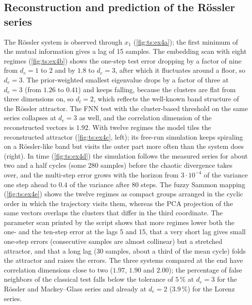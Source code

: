 \subsection{Reconstruction and prediction of the R\"ossler series}

The R\"ossler system is observed through $x_1$ (\cref{fig:ts:ex4a}); the first minimum of the mutual information gives a lag of 15 samples. The embedding scan with eight regimes (\cref{fig:ts:ex4b}) shows the one-step test error dropping by a factor of nine from $d_e=1$ to $2$ and by $1.8$ to $d_e=3$, after which it fluctuates around a floor, so $d_e=3$. The prior-weighted smallest eigenvalue drops by a factor of three at $d_e=3$ (from $1.26$ to $0.41$) and keeps falling, because the clusters are flat from three dimensions on, so $d_l=2$, which reflects the well-known band structure of the R\"ossler attractor. The FNN test with the cluster-based threshold on the same series collapses at $d_e=3$ as well, and the correlation dimension of the reconstructed vectors is $1.92$. With twelve regimes the model tiles the reconstructed attractor (\cref{fig:ts:ex4c}, left); its free-run simulation keeps spiraling on a R\"ossler-like band but visits the outer part more often than the system does (right). In time (\cref{fig:ts:ex4d}) the simulation follows the measured series for about two and a half cycles (some 280 samples) before the chaotic divergence takes over, and the multi-step error grows with the horizon from $3\cdot10^{-4}$ of the variance one step ahead to $0.4$ of the variance after 80 steps. The fuzzy Sammon mapping (\cref{fig:ts:ex4e}) shows the twelve regimes as compact groups arranged in the cyclic order in which the trajectory visits them, whereas the PCA projection of the same vectors overlaps the clusters that differ in the third coordinate. The parameter scan printed by the script shows that more regimes lower both the one- and the ten-step error at the lags 5 and 15, that a very short lag gives small one-step errors (consecutive samples are almost collinear) but a stretched attractor, and that a long lag (30 samples, about a third of the mean cycle) folds the attractor and raises the errors. The three systems compared at the end have correlation dimensions close to two ($1.97$, $1.90$ and $2.00$); the percentage of false neighbors of the classical test falls below the tolerance of $5\,\%$ at $d_e=3$ for the R\"ossler and Mackey--Glass series and already at $d_e=2$ ($3.9\,\%$) for the Lorenz series.

